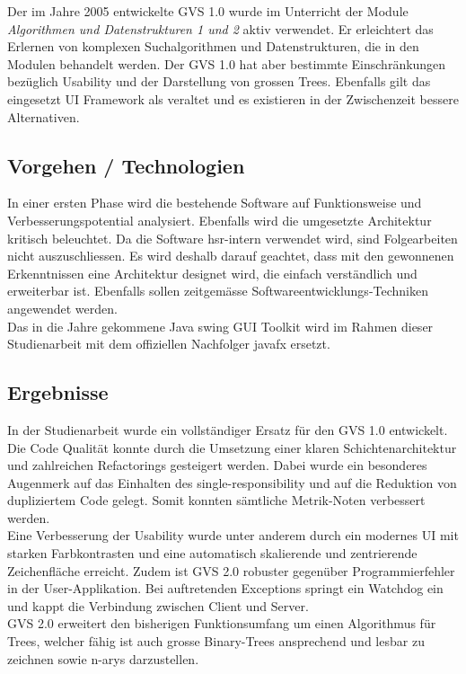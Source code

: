 \documentclass[11pt,a4paper,english,oneside]{book}
\numberwithin{equation}{chapter}
\begin{document}
	\noindent
	Der im Jahre 2005 entwickelte GVS 1.0 wurde im Unterricht der Module \textit{Algorithmen und Datenstrukturen 1 und 2} aktiv verwendet. Er erleichtert das Erlernen von komplexen Suchalgorithmen und Datenstrukturen, die in den Modulen behandelt werden. Der GVS 1.0 hat aber bestimmte Einschränkungen bezüglich Usability und der Darstellung von grossen Trees. Ebenfalls gilt das eingesetzt UI Framework als veraltet und es existieren in der Zwischenzeit bessere Alternativen.
	
	\subsection*{Vorgehen / Technologien}	
	In einer ersten Phase wird die bestehende Software auf Funktionsweise und Verbesserungspotential analysiert. Ebenfalls wird die umgesetzte Architektur kritisch beleuchtet. Da die Software \gls{hsr}-intern verwendet wird, sind Folgearbeiten nicht auszuschliessen. Es wird deshalb darauf geachtet, dass mit den gewonnenen Erkenntnissen eine Architektur designet wird, die einfach verständlich und erweiterbar ist. Ebenfalls sollen zeitgemässe Softwareentwicklungs-Techniken angewendet werden. \\
	
	\noindent
	Das in die Jahre gekommene Java \gls{swing} GUI Toolkit wird im Rahmen dieser Studienarbeit mit dem offiziellen Nachfolger \gls{javafx} ersetzt. 
	
	\subsection*{Ergebnisse}
	In der Studienarbeit wurde ein vollständiger Ersatz für den GVS 1.0 entwickelt.\\
	Die Code Qualität konnte durch die Umsetzung einer klaren Schichtenarchitektur und zahlreichen Refactorings gesteigert werden. Dabei wurde ein besonderes Augenmerk auf das Einhalten des \gls{single-responsibility} und auf die Reduktion von dupliziertem Code gelegt. Somit konnten sämtliche Metrik-Noten verbessert werden.\\
	Eine Verbesserung der Usability wurde unter anderem durch ein modernes UI mit starken Farbkontrasten und eine automatisch skalierende und zentrierende Zeichenfläche erreicht. Zudem ist GVS 2.0 robuster gegenüber Programmierfehler in der User-Applikation. Bei auftretenden Exceptions springt ein Watchdog ein und kappt die Verbindung zwischen Client und Server.\\
	GVS 2.0 erweitert den bisherigen Funktionsumfang um einen Algorithmus für Trees, welcher fähig ist auch grosse Binary-Trees ansprechend und lesbar zu zeichnen sowie \gls{n-ary}s darzustellen.
	
\end{document}
